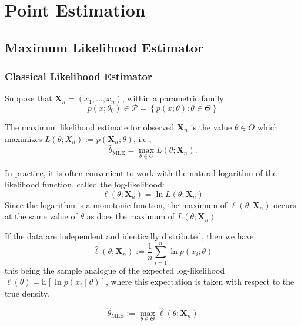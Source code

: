 \chapter{Point Estimation}

\section{Maximum Likelihood Estimator}

\subsection{Classical Likelihood Estimator}

Suppose that $\mathbf{X}_{n}=\left(x_{1},\ldots,x_{n}\right)$, within a parametric family
\begin{equation}
	p\left(x;\theta_{0}\right)\in\mathcal{P}=\left\{p(x;\theta):\theta\in\Theta\right\}
\end{equation}

The maximum likelihood estimate for observed $\mathbf{X}_{n}$ is the value $\theta\in\Theta$ which maximizes $L\left(\theta;X_{n}\right):=p\left(\mathbf{X}_{n};\theta\right)$, i.e.,
\begin{equation}
	\hat{\theta}_{\text{MLE}}=\max_{\theta\in\Theta}L\left(\theta;\mathbf{X}_{n}\right).
\end{equation}

In practice, it is often convenient to work with the natural logarithm of the likelihood function, called the log-likelihood:
\begin{equation}
	\ell\left(\theta;\mathbf{X}_{n}\right)=\ln L\left(\theta;\mathbf{X}_{n}\right)
\end{equation}
Since the logarithm is a monotonic function, the maximum of $\ell\left(\theta;\mathbf{X}_{n}\right)$ occurs at the same value of $\theta$ as does the maximum of $L\left(\theta;\mathbf{X}_{n}\right)$

If the data are independent and identically distributed, then we have
\begin{equation}
	\hat{\ell}\left(\theta;\mathbf{X}_{n}\right):=\frac{1}{n}\sum_{i=1}^{n}\ln p\left(x_{i};\theta\right)
\end{equation}
this being the sample analogue of the expected log-likelihood $\ell(\theta)=\mathbb{E}\left[\ln p\left(x_{i} \mid \theta\right)\right]$, where this expectation is taken with respect to the true density.

\begin{equation}
	\hat{\theta}_{\text{MLE}}:=\max_{\theta\in\Theta}\hat{\ell}\left(\theta;\mathbf{X}_{n}\right)
\end{equation}

